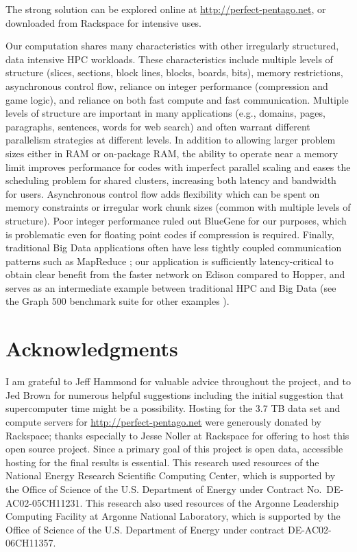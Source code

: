 \documentclass[conference]{IEEEtran}
\begin{document}
The strong solution can be explored online at \url{http://perfect-pentago.net}, or downloaded from Rackspace
for intensive uses.

Our computation shares many characteristics with other irregularly structured, data intensive HPC workloads.
These characteristics include multiple levels of structure (slices, sections, block lines, blocks, boards,
bits), memory restrictions, asynchronous control flow, reliance on integer performance (compression and game
logic), and reliance on both fast compute and fast communication.  Multiple levels of structure are important
in many applications (e.g., domains, pages, paragraphs, sentences, words for web search) and often warrant
different parallelism strategies at different levels.  In addition to allowing larger problem sizes either
in RAM or on-package RAM, the ability to operate near a memory limit improves performance for codes with
imperfect parallel scaling and eases the scheduling problem for shared clusters, increasing both latency and
bandwidth for users.  Asynchronous control flow adds flexibility which can be spent on memory constraints or
irregular work chunk sizes (common with multiple levels of structure).  Poor integer performance ruled out
BlueGene for our purposes, which is problematic even for floating point codes if compression is required.
Finally, traditional Big Data applications often have less tightly coupled communication patterns such as
MapReduce \cite{dean2008mapreduce}; our application is sufficiently latency-critical to obtain clear benefit
from the faster network on Edison compared to Hopper, and serves as an intermediate example between traditional
HPC and Big Data (see the Graph 500 benchmark suite for other examples \cite{murphy2010graph500}).

\section*{Acknowledgments}

I am grateful to Jeff Hammond for valuable advice throughout the project, and to Jed Brown for numerous helpful
suggestions including the initial suggestion that supercomputer time might be a possibility.
Hosting for the 3.7 TB data set and compute servers for \url{http://perfect-pentago.net} were generously donated
by Rackspace; thanks especially to Jesse Noller at Rackspace for offering to host this open source project.
Since a primary goal of this project is open data, accessible hosting for the final results is essential.
This research used resources of the National Energy Research Scientific Computing Center, which is supported by
the Office of Science of the U.S. Department of Energy under Contract No.\ DE-AC02-05CH11231.  This research also
used resources of the Argonne Leadership Computing Facility at Argonne National Laboratory, which is supported by
the Office of Science of the U.S. Department of Energy under contract DE-AC02-06CH11357.



\end{document}
